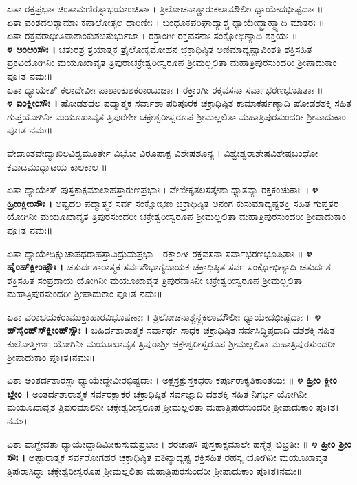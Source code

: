 ಏತಾ ರಕ್ತಪ್ರಭಾಃ ಚಿಂತಾಮಣಿರತ್ನಾಭಯಾಂಚಿತಾಃ । ತ್ರಿಲೋಚನಾಶ್ಚಾರುಕಲಾಮೌಲೀಃ ಧ್ಯಾಯೇದಭೀಷ್ಟದಾಃ ॥\\
ಏತಾ ವಂಶದಲಶ್ಯಾಮಾಃ ಕಪಾಲೋತ್ಫಲ ಧಾರಿಣೀಃ । ಬಂಧೂಕಪರಿಘಾದ್ಯಾಶ್ಚ ಧ್ಯಾಯೇದ್ಬ್ರಾಹ್ಮ್ಯಾದಿ ಮಾತರಃ ॥\\
ಏತಾ ರಕ್ತವರಾಭೀತಿಪಾಶಾಂಕುಶಚತುರ್ಭುಜಾ । ರಕ್ತಾಂಗೀ ರಕ್ತವಸನಾಃ ಸಂಕ್ಷೋಭಿಣ್ಯಾದಿ ಶಕ್ತಯಃ ॥\\
{\bfseries ೪ ಅಂಆಂಸೌಃ ।} ಚತುರಶ್ರ ತ್ರಯಾತ್ಮಕ ತ್ರೈಲೋಕ್ಯಮೋಹನ ಚಕ್ರಾಧಿಷ್ಠಿತ ಅಣಿಮಾದ್ಯಷ್ಟಾವಿಂಶತಿ ಶಕ್ತಿಸಹಿತ ಪ್ರಕಟಯೋಗಿನೀ ಮಯೂಖಾವೃತ ತ್ರಿಪುರಾಚಕ್ರೇಶ್ವರೀಸ್ವರೂಪ ಶ್ರೀಮಲ್ಲಲಿತಾ ಮಹಾತ್ರಿಪುರಸುಂದರೀ ಶ್ರೀಪಾದುಕಾಂ ಪೂ।ತ।ನಮಃ॥\\
ಏತಾ ಧ್ಯಾಯೇತ್ ಕಲಾದೇವೀಃ ಪಾಶಾಂಕುಶಕರಾಂಬುಜಾಃ । ರಕ್ತಾಂಗೀ ರಕ್ತವಸನಾ ಸರ್ವಾಭರಣಭೂಷಿತಾಃ ॥\\
{\bfseries ೪ ಐಂಕ್ಲೀಂಸೌಃ ।} ಷೋಡಶದಲ ಪದ್ಮಾತ್ಮಕ ಸರ್ವಾಶಾ ಪರಿಪೂರಕ ಚಕ್ರಾಧಿಷ್ಠಿತ ಕಾಮಾಕರ್ಷಣ್ಯಾದಿ ಷೋಡಶಶಕ್ತಿ ಸಹಿತ ಗುಪ್ತಯೋಗಿನೀ ಮಯೂಖಾವೃತ ತ್ರಿಪುರೇಶೀ ಚಕ್ರೇಶ್ವರೀಸ್ವರೂಪ ಶ್ರೀಮಲ್ಲಲಿತಾ ಮಹಾತ್ರಿಪುರಸುಂದರೀ ಶ್ರೀಪಾದುಕಾಂ ಪೂ।ತ।ನಮಃ॥

ವೇದಾಂತವೇದ್ಯಾಖಿಲವಿಶ್ವಮೂರ್ತೇ ವಿಭೋ ವಿರೂಪಾಕ್ಷ ವಿಶೇಷಶೂನ್ಯ ।
ವಿಶ್ವೇಶ್ವರಾಶೇಷವಿಶೇಷಬಂಧೋ ಕವಾಟಮುದ್ಘಾಟಯ ಕಾಲಕಾಲ ॥

ಏತಾ ಧ್ಯಾಯೇತ್ ಪುಸ್ತಕಾಕ್ಷಮಾಲಾಹಸ್ತಾರುಣಪ್ರಭಾಃ । ವೇಣೀಕೃತಲಸತ್ಕೇಶಾ ಧ್ಯಾತವ್ಯಾ ರಕ್ತಕಂಚುಕಾಃ ॥
{\bfseries ೪ ಹ್ರೀಂಕ್ಲೀಂಸೌಃ ।} ಅಷ್ಟದಲ ಪದ್ಮಾತ್ಮಕ ಸರ್ವ ಸಂಕ್ಷೋಭಣ ಚಕ್ರಾಧಿಷ್ಠಿತ ಅನಂಗ ಕುಸುಮಾದ್ಯಷ್ಟಶಕ್ತಿ ಸಹಿತ ಗುಪ್ತತರ ಯೋಗಿನೀ ಮಯೂಖಾವೃತ ತ್ರಿಪುರಸುಂದರೀ ಚಕ್ರೇಶ್ವರೀಸ್ವರೂಪ ಶ್ರೀಮಲ್ಲಲಿತಾ ಮಹಾತ್ರಿಪುರಸುಂದರೀ ಶ್ರೀಪಾದುಕಾಂ ಪೂ।ತ।ನಮಃ॥

ಏತಾ ಧ್ಯಾಯೇದಿಕ್ಷುಚಾಪಧರಾಹಸ್ತಾವಿದ್ರುಮಪ್ರಭಾ । ರಕ್ತಾಂಗೀ ರಕ್ತವಸನಾ ಸರ್ವಾಭರಣಭೂಷಿತಾಃ ॥
{\bfseries ೪ ಹೈಂಹ್‌ಕ್ಲೀಂಹ್ಸೌಃ ।} ಚತುರ್ದಶಾರಾತ್ಮಕ ಸರ್ವಸೌಭಾಗ್ಯದಾಯಕ ಚಕ್ರಾಧಿಷ್ಠಿತ ಸರ್ವ ಸಂಕ್ಷೋಭಿಣ್ಯಾದಿ ಚತುರ್ದಶ ಶಕ್ತಿಸಹಿತ ಸಂಪ್ರದಾಯ ಯೋಗಿನೀ ಮಯೂಖಾವೃತ ತ್ರಿಪುರವಾಸಿನೀ ಚಕ್ರೇಶ್ವರೀಸ್ವರೂಪ ಶ್ರೀಮಲ್ಲಲಿತಾ ಮಹಾತ್ರಿಪುರಸುಂದರೀ ಶ್ರೀಪಾದುಕಾಂ ಪೂ।ತ।ನಮಃ॥

ಏತಾ ವರಾಭಯಕರಾಮುಕ್ತಾಹಾರವಿಭೂಷಣಾಃ । ತ್ರಿಲೋಚನಾಶ್ಚನ್ದ್ರಕಲಾಮೌಲೀಃ ಧ್ಯಾಯೇದಭೀಷ್ಟದಾಃ ॥
{\bfseries ೪ ಹ್‌ಸೈಂಹ್‌ಸ್‌ಕ್ಲೀಂಹ್‌ಸ್ಸೌಃ ।} ಬಹಿರ್ದಶಾರಾತ್ಮಕ ಸರ್ವಾರ್ಥ ಸಾಧಕ ಚಕ್ರಾಧಿಷ್ಠಿತ ಸರ್ವಸಿದ್ಧಿಪ್ರದಾದಿ ದಶಶಕ್ತಿ ಸಹಿತ ಕುಲೋತ್ತೀರ್ಣ ಯೋಗಿನೀ ಮಯೂಖಾವೃತ ತ್ರಿಪುರಾಶ್ರೀ ಚಕ್ರೇಶ್ವರೀಸ್ವರೂಪ ಶ್ರೀಮಲ್ಲಲಿತಾ ಮಹಾತ್ರಿಪುರಸುಂದರೀ ಶ್ರೀಪಾದುಕಾಂ ಪೂ।ತ।ನಮಃ॥

ಏತಾ ಅಂತರ್ದಶಾರಸ್ಥಾ ಧ್ಯಾಯೇದ್ದೇವೀರಭಿಷ್ಟದಾಃ । ಅಕ್ಷಸ್ರಕ್ಪುಸ್ತಕಧರಾ ಕರ್ಪೂರಾಕೃತಿಕಾಂತಯಃ ॥
{\bfseries ೪ ಹ್ರೀಂ ಕ್ಲೀಂ ಬ್ಲೇಂ ।} ಅಂತರ್ದಶಾರಾತ್ಮಕ ಸರ್ವರಕ್ಷಾಕರ ಚಕ್ರಾಧಿಷ್ಠಿತ ಸರ್ವಜ್ಞಾದಿ ದಶಶಕ್ತಿ ಸಹಿತ ನಿಗರ್ಭ ಯೋಗಿನೀ ಮಯೂಖಾವೃತ ತ್ರಿಪುರಮಾಲಿನೀ ಚಕ್ರೇಶ್ವರೀಸ್ವರೂಪ ಶ್ರೀಮಲ್ಲಲಿತಾ ಮಹಾತ್ರಿಪುರಸುಂದರೀ ಶ್ರೀಪಾದುಕಾಂ ಪೂ।ತ।ನಮಃ॥

ಏತಾ ವಾಗ್ದೇವತಾ ಧ್ಯಾಯೇದ್ದಾಡಿಮೀಕುಸುಮಪ್ರಭಾಃ । ಶರಚಾಪೌ ಪುಸ್ತಕಾಕ್ಷಮಾಲೇ ಹಸ್ತೈಶ್ಚ ಬಿಭ್ರತೀಃ ॥
{\bfseries ೪ ಹ್ರೀಂ ಶ್ರೀಂ ಸೌಃ ।} ಅಷ್ಟಾರಾತ್ಮಕ ಸರ್ವರೋಗಹರ ಚಕ್ರಾಧಿಷ್ಠಿತ ವಶಿನ್ಯಾದ್ಯಷ್ಟ ಶಕ್ತಿಸಹಿತ ರಹಸ್ಯ ಯೋಗಿನೀ ಮಯೂಖಾವೃತ ತ್ರಿಪುರಾಸಿದ್ಧಾ ಚಕ್ರೇಶ್ವರೀಸ್ವರೂಪ ಶ್ರೀಮಲ್ಲಲಿತಾ ಮಹಾತ್ರಿಪುರಸುಂದರೀ ಶ್ರೀಪಾದುಕಾಂ ಪೂ।ತ।ನಮಃ॥

